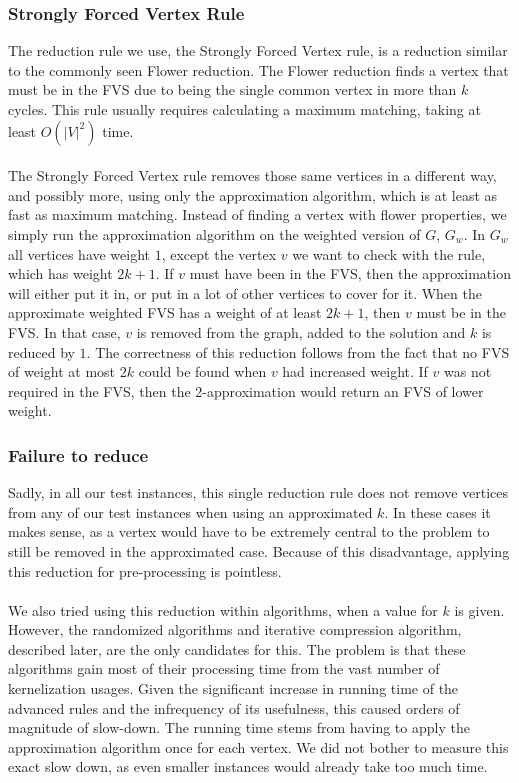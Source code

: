 \subsubsection{Strongly Forced Vertex Rule}\label{rule11}
The reduction rule we use, the Strongly Forced Vertex rule, is a reduction similar to the commonly seen Flower reduction. The Flower reduction finds a vertex that must be in the FVS due to being the single common vertex in more than $k$ cycles. This rule usually requires calculating a maximum matching, taking at least $O(|V|^2)$ time. \\\\
The Strongly Forced Vertex rule removes those same vertices in a different way, and possibly more, using only the approximation algorithm, which is at least as fast as maximum matching. Instead of finding a vertex with flower properties, we simply run the approximation algorithm on the weighted version of $G$, $G_w$. In $G_w$ all vertices have weight $1$, except the vertex $v$ we want to check with the rule, which has weight $2k+1$. If $v$ must have been in the FVS, then the approximation will either put it in, or put in a lot of other vertices to cover for it. When the approximate weighted FVS has a weight of at least $2k+1$, then $v$ must be in the FVS. In that case, $v$ is removed from the graph, added to the solution and $k$ is reduced by $1$. The correctness of this reduction follows from the fact that no FVS of weight at most $2k$ could be found when $v$ had increased weight. If $v$ was not required in the FVS, then the 2-approximation would return an FVS of lower weight.
\subsubsection{Failure to reduce}
Sadly, in all our test instances, this single reduction rule does not remove vertices from any of our test instances when using an approximated $k$. In these cases it makes sense, as a vertex would have to be extremely central to the problem to still be removed in the approximated case. Because of this disadvantage, applying this reduction for pre-processing is pointless. \\\\
We also tried using this reduction within algorithms, when a value for $k$ is given. However, the randomized algorithms and iterative compression algorithm, described later, are the only candidates for this. The problem is that these algorithms gain most of their processing time from the vast number of kernelization usages. Given the significant increase in running time of the advanced rules and the infrequency of its usefulness, this caused orders of magnitude of slow-down. The running time stems from having to apply the approximation algorithm once for each vertex. We did not bother to measure this exact slow down, as even smaller instances would already take too much time.
